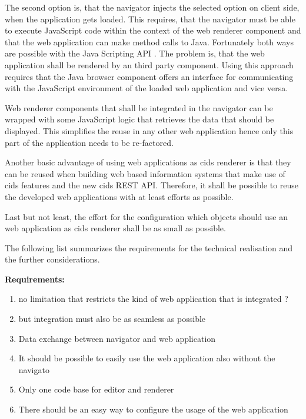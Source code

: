 The second option is, that the navigator injects the selected option on client side, when the application gets loaded.
This requires, that the navigator must be able to execute JavaScript code within the context of the web renderer component and that the web application can make method calls to Java.
Fortunately both ways are possible with the Java Scripting API \autocite{conception:rhino}.
The problem is, that the web application shall be rendered by an third party component.
Using this approach requires that the Java browser component offers an interface for communicating with the JavaScript environment of the loaded web application and vice versa.

Web renderer components that shall be integrated in the navigator can be wrapped with some JavaScript logic that retrieves the data that should be displayed.
This simplifies the reuse in any other web application hence only this part of the application needs to be re-factored.
	
Another basic advantage of using web applications as cids renderer is that they can be reused when building web based information systems that make use of cids features and the new cids REST API.
Therefore, it shall be possible to reuse the developed web applications with at least efforts as possible.

Last but not least, the effort for the configuration which objects should use an web application as cids renderer shall be as small as possible.

The following list summarizes the requirements for the technical realisation and the further considerations.

\textbf{Requirements:}
\begin{enumerate}
\item no limitation that restricts the kind of web application that is integrated ?
\item but integration must also be as seamless as possible 
\item Data exchange between navigator and web application
\item It should be possible to easily use the web application also without the navigato
\item Only one code base for editor and renderer
\item There should be an easy way to configure the usage of the web application
\end{enumerate} 


